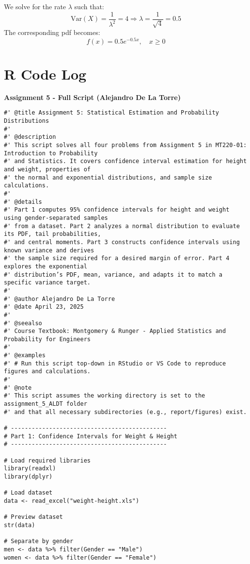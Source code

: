 \documentclass[12pt]{article}
\begin{document}
We solve for the rate $\lambda$ such that:
\[
\text{Var}(X) = \frac{1}{\lambda^2} = 4 \Rightarrow \lambda = \frac{1}{\sqrt{4}} = 0.5
\]
The corresponding pdf becomes:
\[
f(x) = 0.5 e^{-0.5x}, \quad x \geq 0
\]

\newpage
\section*{R Code Log}

\textbf{Assignment 5 - Full Script (Alejandro De La Torre)}

\hrulefill

\begin{verbatim}
#' @title Assignment 5: Statistical Estimation and Probability Distributions
#'
#' @description
#' This script solves all four problems from Assignment 5 in MT220-01: Introduction to Probability 
#' and Statistics. It covers confidence interval estimation for height and weight, properties of 
#' the normal and exponential distributions, and sample size calculations.
#'
#' @details
#' Part 1 computes 95% confidence intervals for height and weight using gender-separated samples 
#' from a dataset. Part 2 analyzes a normal distribution to evaluate its PDF, tail probabilities, 
#' and central moments. Part 3 constructs confidence intervals using known variance and derives 
#' the sample size required for a desired margin of error. Part 4 explores the exponential 
#' distribution’s PDF, mean, variance, and adapts it to match a specific variance target.
#'
#' @author Alejandro De La Torre
#' @date April 23, 2025
#'
#' @seealso
#' Course Textbook: Montgomery & Runger - Applied Statistics and Probability for Engineers
#'
#' @examples
#' # Run this script top-down in RStudio or VS Code to reproduce figures and calculations.
#'
#' @note
#' This script assumes the working directory is set to the assignment_5_ALDT folder 
#' and that all necessary subdirectories (e.g., report/figures) exist.

# ---------------------------------------------
# Part 1: Confidence Intervals for Weight & Height
# ---------------------------------------------

# Load required libraries
library(readxl)
library(dplyr)

# Load dataset
data <- read_excel("weight-height.xls")

# Preview dataset
str(data)

# Separate by gender
men <- data %>% filter(Gender == "Male")
women <- data %>% filter(Gender == "Female")


\end{verbatim}
\end{document}
